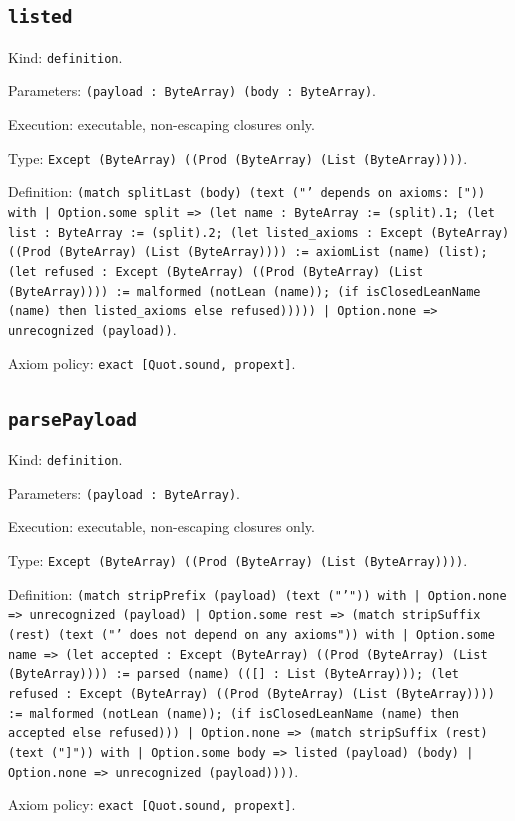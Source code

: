 \documentclass[11pt]{article}
\begin{document}
\subsection*{\texttt{listed}}
\noindent Kind: \texttt{definition}.\par
\noindent Parameters: \texttt{(payload : ByteArray) (body : ByteArray)}.\par
\noindent Execution: executable, non-escaping closures only.\par
\noindent Type: \texttt{Except (ByteArray) ((Prod (ByteArray) (List (ByteArray))))}.\par
\noindent Definition: \texttt{(match splitLast (body) (text ("' depends on axioms: [")) with | Option.some split => (let name : ByteArray := (split).1; (let list : ByteArray := (split).2; (let listed\_axioms : Except (ByteArray) ((Prod (ByteArray) (List (ByteArray)))) := axiomList (name) (list); (let refused : Except (ByteArray) ((Prod (ByteArray) (List (ByteArray)))) := malformed (notLean (name)); (if isClosedLeanName (name) then listed\_axioms else refused))))) | Option.none => unrecognized (payload))}.\par
\noindent Axiom policy: \texttt{exact [Quot.sound, propext]}.\par
\subsection*{\texttt{parsePayload}}
\noindent Kind: \texttt{definition}.\par
\noindent Parameters: \texttt{(payload : ByteArray)}.\par
\noindent Execution: executable, non-escaping closures only.\par
\noindent Type: \texttt{Except (ByteArray) ((Prod (ByteArray) (List (ByteArray))))}.\par
\noindent Definition: \texttt{(match stripPrefix (payload) (text ("'")) with | Option.none => unrecognized (payload) | Option.some rest => (match stripSuffix (rest) (text ("' does not depend on any axioms")) with | Option.some name => (let accepted : Except (ByteArray) ((Prod (ByteArray) (List (ByteArray)))) := parsed (name) (([] : List (ByteArray))); (let refused : Except (ByteArray) ((Prod (ByteArray) (List (ByteArray)))) := malformed (notLean (name)); (if isClosedLeanName (name) then accepted else refused))) | Option.none => (match stripSuffix (rest) (text ("]")) with | Option.some body => listed (payload) (body) | Option.none => unrecognized (payload))))}.\par
\noindent Axiom policy: \texttt{exact [Quot.sound, propext]}.\par
\end{document}
